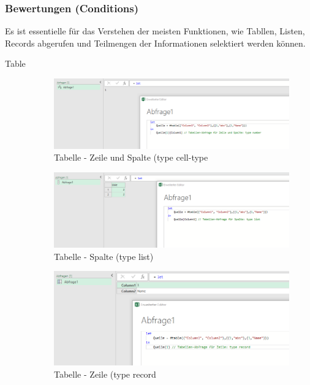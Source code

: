 \subsubsection{Bewertungen (Conditions)}
Es ist essentielle für das Verstehen der meisten Funktionen, wie Tabllen, Listen, Records abgerufen und Teilmengen der Informationen selektiert werden können.
\begin{description}
\item[Table]
\begin{figure}[H]
	\centering
	\includegraphics[scale = 0.3]{attachment/chapter_1/screenshot052}
	\caption{Tabelle - Zeile und Spalte (type cell-type}
	\label{fig:screenshot052}
\end{figure}
\begin{figure}[H]
	\centering
	\includegraphics[scale = 0.3]{attachment/chapter_1/screenshot053}
	\caption{Tabelle - Spalte (type list)}
	\label{fig:screenshot053}
\end{figure}
\begin{figure}[H]
	\centering
	\includegraphics[scale = 0.3]{attachment/chapter_1/screenshot054}
	\caption{Tabelle - Zeile (type record}
	\label{fig:screenshot054}

\end{figure}
\end{description}
